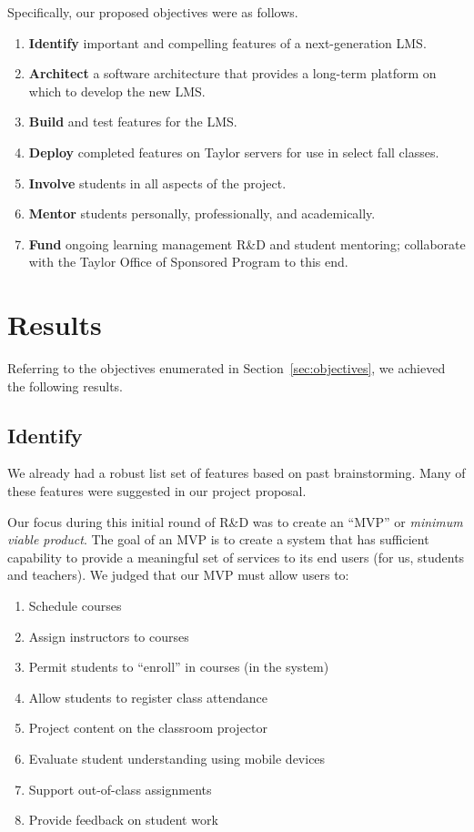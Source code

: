 \documentclass{article}
\begin{document}
Specifically, our proposed objectives
were as follows.
\begin{enumerate}
\item \textbf{Identify}
  important and compelling features of
  a next-generation LMS.
\item \textbf{Architect}
  a software architecture
  that provides a long-term platform
  on which to develop the new LMS.
\item \textbf{Build}
  and test features for the LMS.
\item \textbf{Deploy}
  completed features
  on Taylor servers
  for use in select fall classes.
\item \textbf{Involve}
  students in all aspects of the project.
\item \textbf{Mentor}
  students personally, professionally,
  and academically.
\item \textbf{Fund}
  ongoing learning management R\&D and student mentoring;
  collaborate with the Taylor Office of Sponsored Program
  to this end.
\end{enumerate}

\section{Results}
\label{sec:results}

Referring to the objectives enumerated in Section~\ref{sec:objectives},
we achieved the following results.

\subsection{Identify}
\label{sec:identify}

We already had a robust list set of features
based on past brainstorming.
Many of these features were suggested in our project proposal.

Our focus during this initial round of R\&D
was to create an ``MVP'' or \emph{minimum viable product}.
The goal of an MVP is to create a system
that has sufficient capability
to provide a meaningful set of services
to its end users (for us, students and teachers).
We judged that our MVP
must allow users to:
\begin{enumerate}
\item Schedule courses
\item Assign instructors to courses
\item Permit students to ``enroll'' in courses (in the system)
\item Allow students to register class attendance
\item Project content on the classroom projector
\item Evaluate student understanding using mobile devices
\item Support out-of-class assignments
\item Provide feedback on student work
\end{enumerate}
\end{document}

